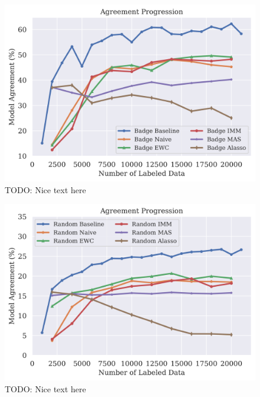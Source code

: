 \begin{figure}[h]
    \centering
    \includegraphics[width=0.8\linewidth]{images/results_CALMS/cifar_label_badge.png}
    \caption[Agreement Comparison for Model Stealing on CIFAR10 using the top1-label and the Active Learning strategy Badge]{TODO: Nice text here}
    \label{fig:CALMSCIFAR10LabelBadge}
\end{figure}

\begin{figure}[h]
    \centering
    \includegraphics[width=0.8\linewidth]{images/results_CALMS/cifar100_softmax_random.png}
    \caption[Agreement Comparison for Model Stealing on CIFAR10 using the softmax output and the Active Learning strategy Random]{TODO: Nice text here}
    \label{fig:CALMSCIFAR10SoftmaxRandom}
\end{figure}

